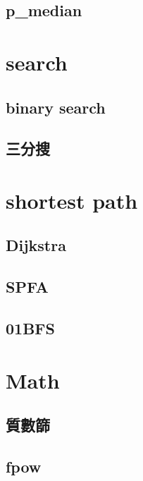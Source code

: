 \documentclass[a4paper,10pt,twocolumn,oneside]{article}
\begin{document}
    \subsection{p\_median}
    

\section{search}
    \subsection{binary search}
    
    
    \subsection{三分搜}
    
    
\section{shortest path}
    \subsection{Dijkstra}
    
    
    \subsection{SPFA}
    

    \subsection{01BFS}
    

\section{Math}
    \subsection{質數篩}
    

    \subsection{fpow}
    
\end{document}
